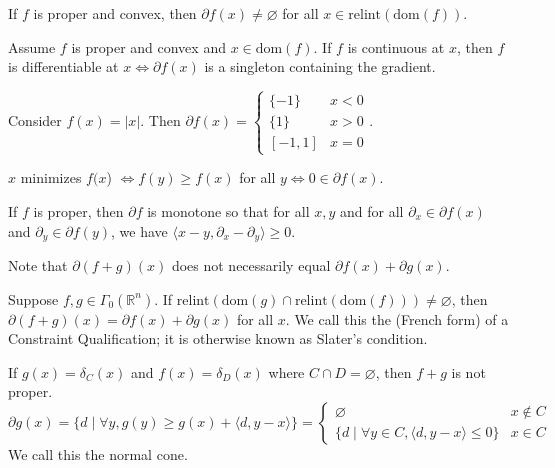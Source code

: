 \documentclass[english, 11pt]{article}
\begin{document}
  \begin{thrm}
  If $f$ is proper and convex, then $\partial f(x) \neq \varnothing$ for all $x \in \text{relint}(\text{dom}(f))$.
  \end{thrm}

  \begin{thrm}
  Assume $f$ is proper and convex and $x \in \text{dom}(f)$. If $f$ is continuous at $x$, then $f$ is differentiable at $x \iff \partial f(x)$ is a singleton containing the gradient.
  \end{thrm}  
  
  \begin{exmp}
  Consider $f(x) = |x|$. Then $\partial f(x) = \begin{cases} \{-1\} & x <0 \\ \{1 \} & x >0 \\ [-1,1] & x =0 \end{cases}$.
  \end{exmp}
  
  \begin{thrm}
  $x$ minimizes $f(x$) $\iff f(y) \ge f(x)$ for all $y \iff 0 \in \partial f(x)$.
  \end{thrm}
  
  \begin{thrm}
  If $f$ is proper, then $\partial f$ is monotone so that for all $x,y$ and for all $\partial_x \in \partial f(x)$ and $\partial_y \in \partial f(y)$, we have $\langle x-y, \partial_x - \partial_y \rangle \ge 0$.
  \end{thrm}
  
  \begin{rem}
  Note that $\partial (f+g)(x)$ does not necessarily equal $\partial f(x) + \partial g(x)$.
  \end{rem}
  
  \begin{thrm}
  Suppose $f,g \in \Gamma_0(\mathbb{R}^n)$. If $\text{relint}(\text{dom}(g) \cap \text{relint}(\text{dom}(f))) \neq \varnothing$, then $\partial (f+g)(x) = \partial f(x) + \partial g(x)$ for all $x$. We call this the (French form) of a Constraint Qualification; it is otherwise known as Slater's condition.
  \end{thrm}
  
  \begin{exmp}
  If $g(x) = \delta_C(x)$ and $f(x) = \delta_D(x)$ where $C \cap D = \varnothing$, then $f+g$ is not proper. 
  \[
  \partial g(x) = \{ d \mid \forall y, g(y) \ge g(x) + \langle d, y-x \rangle \}
  = \begin{cases}
  \varnothing & x \notin C \\
 \{ d \mid \forall y \in C, \langle d, y-x \rangle \le 0 \} & x \in C
  \end{cases}
  \]
  We call this the normal cone.
  \end{exmp}
  
\end{document}
